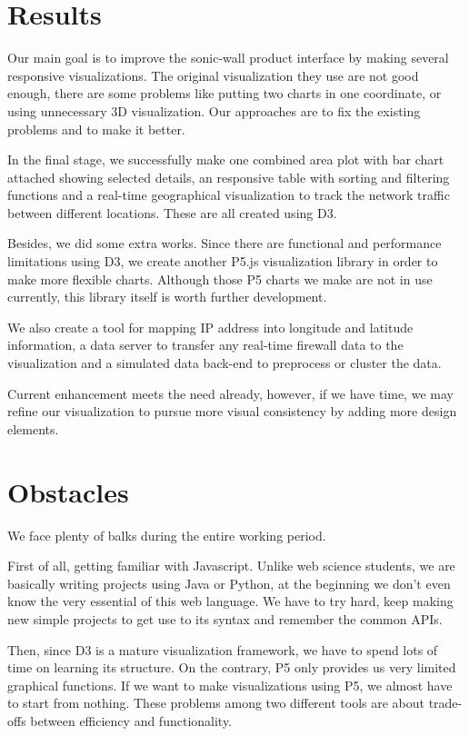 \section{Results}
Our main goal is to improve the sonic-wall product interface by making several responsive visualizations. The original visualization they use are not good enough, there are some problems like putting two charts in one coordinate, or using unnecessary 3D visualization. Our approaches are to fix the existing problems and to make it better. 

In the final stage, we successfully make one combined area plot with bar chart attached showing selected details, an responsive table with sorting and filtering functions and a real-time geographical visualization to track the network traffic between different locations. These are all created using D3.

Besides, we did some extra works. Since there are functional and performance limitations using D3, we create another P5.js visualization library in order to make more flexible charts. Although those P5 charts we make are not in use currently, this library itself is worth further development. 

We also create a tool for mapping IP address into longitude and latitude information, a data server to transfer any real-time firewall data to the visualization and a simulated data back-end to preprocess or cluster the data.

Current enhancement meets the need already, however, if we have time, we may refine our visualization to pursue more visual consistency by adding more design elements.

\section{Obstacles}
We face plenty of balks during the entire working period. 

First of all, getting familiar with Javascript. Unlike web science students, we are basically writing projects using Java or Python, at the beginning we don't even know the very essential of this web language. We have to try hard, keep making new simple projects to get use to its syntax and remember the common APIs. 

Then, since D3 is a mature visualization framework, we have to spend lots of time on learning its structure. On the contrary, P5 only provides us very limited graphical functions. If we want to make visualizations using P5, we almost have to start from nothing. These problems among two different tools are about trade-offs between efficiency and functionality. 

